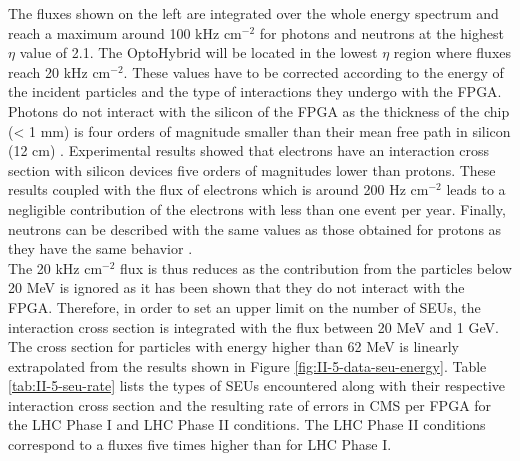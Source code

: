       The fluxes shown on the left are integrated over the whole energy spectrum and reach a maximum around 100 kHz cm$^{-2}$ for photons and neutrons at the highest $\eta$ value of 2.1. The OptoHybrid will be located in the lowest $\eta$ region where fluxes reach 20 kHz cm$^{-2}$. These values have to be corrected according to the energy of the incident particles and the type of interactions they undergo with the FPGA. Photons do not interact with the silicon of the FPGA as the thickness of the chip (< 1 mm) is four orders of magnitude smaller than their mean free path in silicon (12 cm) \cite{Agashe:2014kda}. Experimental results \cite{trad} showed that electrons have an interaction cross section with silicon devices five orders of magnitudes lower than protons. These results coupled with the flux of electrons which is around 200 Hz cm$^{-2}$ leads to a negligible contribution of the electrons with less than one event per year. Finally, neutrons can be described with the same values as those obtained for protons as they have the same behavior \cite{Huhtinen2000155}. \\

       The 20 kHz cm$^{-2}$ flux is thus reduces as the contribution from the particles below 20 MeV is ignored as it has been shown that they do not interact with the FPGA. Therefore, in order to set an upper limit on the number of SEUs, the interaction cross section is integrated with the flux between 20 MeV and 1 GeV. The cross section for particles with energy higher than 62 MeV is linearly extrapolated from the results shown in Figure \ref{fig:II-5-data-seu-energy}. Table \ref{tab:II-5-seu-rate} lists the types of SEUs encountered along with their respective interaction cross section and the resulting rate of errors in CMS per FPGA for the LHC Phase I and LHC Phase II conditions. The LHC Phase II conditions correspond to a fluxes five times higher than for LHC Phase I. \\

